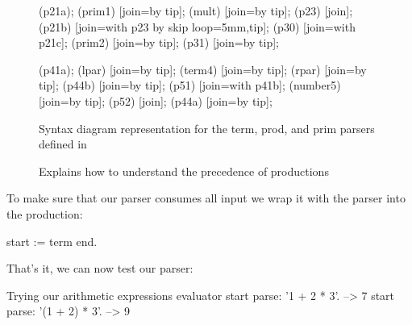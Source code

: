 \documentclass[a4paper,10pt,twoside]{book}
\begin{document}
\begin{figure}
{{    \chainin (p21a);
    \chainin (prim1) [join=by tip];
    \chainin (mult) [join=by tip];
    \chainin (p23)    [join];
    \chainin (p21b)    [join=with p23 by {skip loop=5mm,tip}];
    \chainin (p30)    [join=with p21c];
    \chainin (prim2)    [join=by tip];
    \chainin (p31)    [join=by tip];

    \chainin (p41a);
    \chainin (lpar) [join=by tip];
    \chainin (term4) [join=by tip];
    \chainin (rpar) [join=by tip];
    \chainin (p44b)    [join=by tip];
    \chainin (p51) [join=with p41b];
    \chainin (number5) [join=by tip];
    \chainin (p52) [join];
    \chainin (p44a) [join=by tip];
  }
}
  \caption{Syntax diagram representation for the term, prod, and prim parsers defined in }
  \label{fig:syntax-arithmetic}
\end{figure}

\begin{figure}
  \centering

  \caption{Explains how to understand the precedence of productions}
  \label{fig:expression-precedence}
\end{figure}


To make sure that our parser consumes all input we wrap it with the
 parser into the  production:

\begin{code}{}
start := term end.
\end{code}

That's it, we can now test our parser:

\begin{script}{Trying our arithmetic expressions evaluator}
start parse: '1 + 2 * 3'.       --> 7
start parse: '(1 + 2) * 3'.     --> 9
\end{script}
\end{document}
